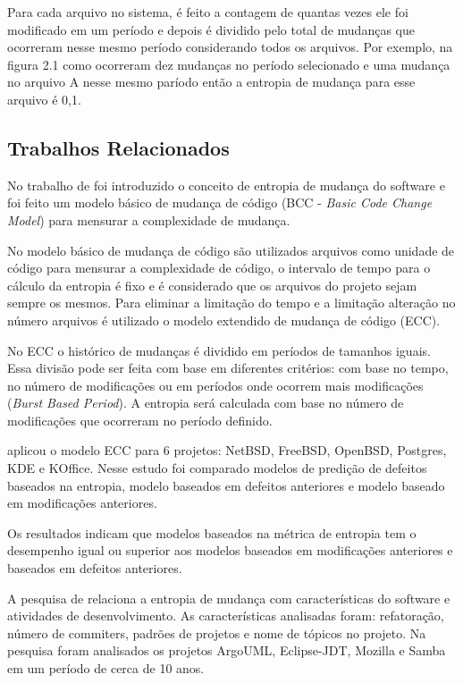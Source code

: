 Para cada arquivo no sistema, é feito a contagem de quantas vezes ele foi modificado em um período e depois é dividido pelo total de mudanças que ocorreram nesse mesmo período considerando todos os arquivos. Por exemplo, na figura 2.1 como ocorreram dez mudanças no período selecionado e uma mudança no arquivo A nesse mesmo paríodo então a entropia de mudança para esse arquivo é 0,1.

\subsection{Trabalhos Relacionados}
No trabalho de  foi introduzido o conceito de entropia de mudança do software e foi feito um modelo básico de mudança de código (BCC - \textit{Basic Code Change Model}) para mensurar a complexidade de mudança.

No modelo básico de mudança de código são utilizados arquivos como unidade de código para mensurar a complexidade de código, o intervalo de tempo para o cálculo da entropia é fixo e é considerado que os arquivos do projeto sejam sempre os mesmos. Para eliminar a limitação do tempo e a limitação alteração no número arquivos é utilizado o modelo extendido de mudança de código (ECC).

No ECC o histórico de mudanças é dividido em períodos de tamanhos iguais. Essa divisão pode ser feita com base em diferentes critérios: com base no tempo, no número de modificações ou em períodos onde ocorrem mais modificações (\textit{Burst Based Period}). A entropia será calculada com base no número de modificações que ocorreram no período definido.

 aplicou o modelo ECC para 6 projetos: NetBSD, FreeBSD, OpenBSD, Postgres, KDE e KOffice. Nesse estudo foi comparado modelos de predição de defeitos baseados na entropia, modelo baseados em defeitos anteriores e modelo baseado em modificações anteriores.

Os resultados indicam que modelos baseados na métrica de entropia tem o desempenho igual ou superior aos modelos baseados em modificações anteriores e baseados em defeitos anteriores.

A pesquisa de  relaciona a entropia de mudança com características do software e atividades de desenvolvimento. As características analisadas foram: refatoração, número de commiters, padrões de projetos e nome de tópicos no projeto. Na pesquisa foram analisados os projetos ArgoUML, Eclipse-JDT, Mozilla e Samba em um período de cerca de 10 anos.

